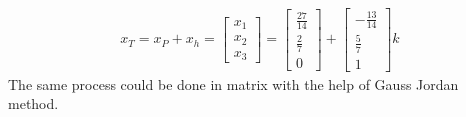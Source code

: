 \documentclass{article}
\begin{document}
\[
\begin{split}
  x_T = x_P+x_h = \begin{bmatrix}
      x_1\\x_2\\x_3
  \end{bmatrix}=\begin{bmatrix}
      \frac{27}{14}\\\frac{2}{7}\\0
  \end{bmatrix}+\begin{bmatrix}
      -\frac{13}{14}\\\frac{5}{7}\\1
  \end{bmatrix}k
\end{split}
\]
 The same process could be done in matrix with the help of Gauss Jordan method.
\end{document}
